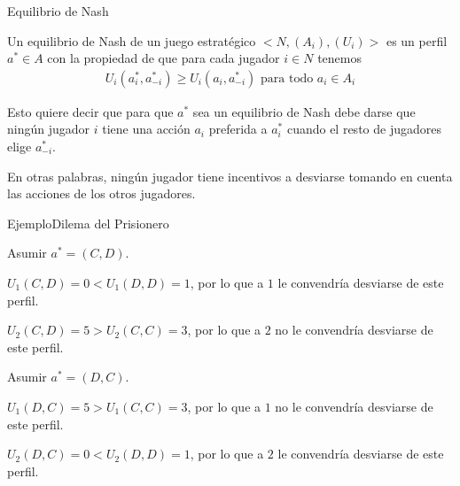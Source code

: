 \documentclass[notes, 11pt]{beamer} %
\newenvironment{wideitemize}{\itemize\addtolength{\itemsep}{10pt}}{\enditemize}
\begin{document}
\begin{frame}{Equilibrio de Nash}
	\begin{wideitemize}
		\item Un equilibrio de Nash de un juego estrat\'egico $\big< N, (A_{i}), (U_{i})\big>$ es un perfil $a^{*} \in A$ con la propiedad de que para cada jugador $i \in N$ tenemos
		\begin{align*}
			U_{i}(a_{i}^{*},a_{-i}^{*}) \geq U_{i}(a_{i},a_{-i}^{*}) \text{ para todo } a_{i} \in A_{i}
		\end{align*}
		\item Esto quiere decir que para que $a^{*}$ sea un equilibrio de Nash debe darse que ning\'un jugador $i$ tiene una acci\'on $a_{i}$ preferida a $a_{i}^{*}$ cuando el resto de jugadores elige $a_{-i}^{*}$.
		\item En otras palabras, ning\'un jugador tiene incentivos a desviarse tomando en cuenta las acciones de los otros jugadores.
	\end{wideitemize}
\end{frame}

\begin{frame}{Ejemplo}{Dilema del Prisionero}
	\begin{wideitemize}
		\item Asumir $a^{*} = (C,D)$.
		\begin{wideitemize}
			\item[--] $U_{1}(C,D) = 0 < U_{1}(D,D) = 1$, por lo que a $1$ le convendr\'ia desviarse de este perfil.
			\item[--] $U_{2}(C,D) = 5 > U_{2}(C,C) = 3$, por lo que a $2$ no le convendr\'ia desviarse de este perfil.
		\end{wideitemize}
		\item Asumir $a^{*} = (D,C)$.
		\begin{wideitemize}
			\item[--] $U_{1}(D,C) = 5 > U_{1}(C,C) = 3$, por lo que a $1$ no le convendr\'ia desviarse de este perfil.
			\item[--] $U_{2}(D,C) = 0 < U_{2}(D,D) = 1$, por lo que a $2$ le convendr\'ia desviarse de este perfil.
		\end{wideitemize}
	\end{wideitemize}
\end{frame}
\end{document}
